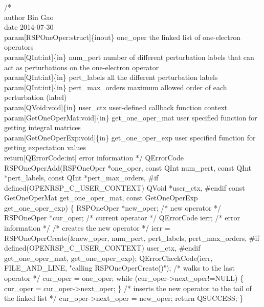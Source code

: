 /*%
    \\author Bin Gao
    \\date 2014-07-30
    \\param[RSPOneOper:struct]\{inout\} one_oper the linked list of one-electron operators
    \\param[QInt:int]\{in\} num_pert number of different perturbation labels that can
        act as perturbations on the one-electron operator
    \\param[QInt:int]\{in\} pert_labels all the different perturbation labels
    \\param[QInt:int]\{in\} pert_max_orders maximum allowed order of each perturbation (label)
    \\param[QVoid:void]\{in\} user_ctx user-defined callback function context
    \\param[GetOneOperMat:void]\{in\} get_one_oper_mat user specified function for
        getting integral matrices
    \\param[GetOneOperExp:void]\{in\} get_one_oper_exp user specified function for
        getting expectation values
    \\return[QErrorCode:int] error information
*/
QErrorCode RSPOneOperAdd(RSPOneOper *one_oper,
                         const QInt num_pert,
                         const QInt *pert_labels,
                         const QInt *pert_max_orders,
#if defined(OPENRSP_C_USER_CONTEXT)
                         QVoid *user_ctx,
#endif
                         const GetOneOperMat get_one_oper_mat,
                         const GetOneOperExp get_one_oper_exp)
\{
    RSPOneOper *new_oper;  /* new operator */
    RSPOneOper *cur_oper;  /* current operator */
    QErrorCode ierr;       /* error information */
    /* creates the new operator */
    ierr = RSPOneOperCreate(&new_oper,
                            num_pert,
                            pert_labels,
                            pert_max_orders,
#if defined(OPENRSP_C_USER_CONTEXT)
                            user_ctx,
#endif
                            get_one_oper_mat,
                            get_one_oper_exp);
    QErrorCheckCode(ierr, FILE_AND_LINE, "calling RSPOneOperCreate()");
    /* walks to the last operator */
    cur_oper = one_oper;
    while (cur_oper->next_oper!=NULL) \{
        cur_oper = cur_oper->next_oper;
    \}
    /* inserts the new operator to the tail of the linked list */
    cur_oper->next_oper = new_oper;
    return QSUCCESS;
\}


